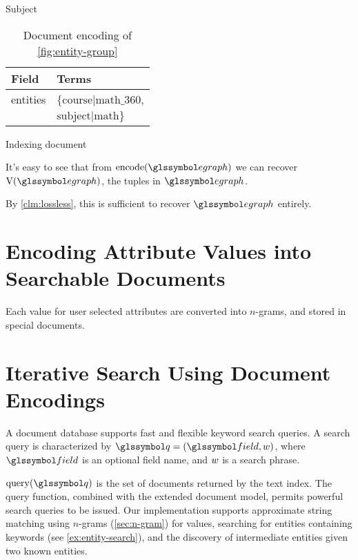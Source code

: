 \begin{ex}
\begin{table}
\begin{subtable}[b]{0.33\linewidth}
					\caption{Subject}
				\end{subtable}
				\begin{subtable}[b]{0.33\linewidth}
					\centering
					
					\begin{tabular}{ll}
						\toprule
						Field & Terms \\
						\midrule
						entities & \(\{\text{course|math\_360}\), \\
						& \(\text{subject|math}\}\) \\
						\bottomrule
					\end{tabular}
					
					\caption{Indexing document}
				\end{subtable}
				
				\caption{Document encoding of \vref{fig:entity-group}}
				\label{tbl:document-encoding}
			\end{table}
		\end{ex}
		
		It's easy to see that from \(\text{encode}(\egraph)\) we can recover \(\text{V}(\egraph)\), the tuples in \(\egraph\).
		
		By \vref{clm:lossless}, this is sufficient to recover \(\egraph\) entirely.
	
	\section{Encoding Attribute Values into Searchable Documents}
		Each value for user selected attributes are converted into \(n\)-grams, and stored in special documents.
	
	\section{Iterative Search Using Document Encodings}
		A document database supports fast and flexible keyword search queries.	A search query is characterized by \(\q = (\field, \w)\), where \(\field\) is an optional field name, and \(w\) is a search phrase.
		
		\(\query(\q)\) is the set of documents returned by the text index.  The query function, combined with the extended document model, permits powerful search queries to be issued.  Our implementation supports approximate string matching using \(n\)-grams (\cref{sec:n-gram}) for values, searching for entities containing keywords (see \vref{ex:entity-search}), and the discovery of intermediate entities given two known entities.
		
